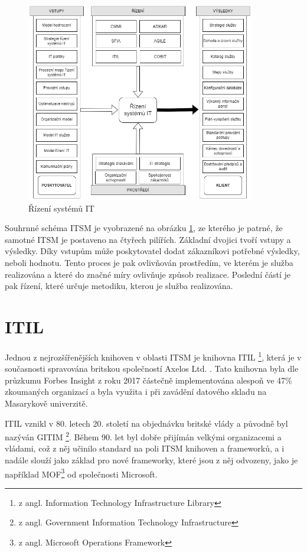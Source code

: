 \documentclass[
  digital,     %
  twoside,     %
  lof,         %
  lot,         %
]{fithesis4}
\begin{document}
\begin{figure}[h]
  \begin{center}
          \includegraphics[width=10cm]{img/itsm-diag.drawio.png}
  \end{center}
  \caption{Řízení systémů IT \parencite[s.~21]{Matula2017}}
  \label{fig:itsmDiag}
\end{figure} 

Souhrnné schéma ITSM je vyobrazené na obrázku \ref{fig:itsmDiag}, ze kterého je patrné, že samotné ITSM je postaveno na čtyřech pilířích. Základní dvojici tvoří vstupy a výsledky. Díky vstupům může poskytovatel dodat zákazníkovi potřebné výsledky, neboli hodnotu. Tento proces je pak ovlivňován prostředím, ve kterém je služba realizována a které do značné míry ovlivňuje způsob realizace. Poslední částí je pak řízení, které určuje metodiku, kterou je služba realizována. 


\section{ITIL}
Jednou z nejrozšířenějších knihoven v oblasti ITSM je knihovna ITIL \footnote{z angl. Information Technology Infrastructure Library}, která je v současnosti spravována britskou společností Axelos Ltd. \parencite[s.~31]{Matula2017}. Tato knihovna byla dle průzkumu Forbes Insight z roku 2017 částečně implementována alespoň ve 47\% zkoumaných organizací\parencite{Watts3082017} a byla využita i při  zavádění datového skladu na Masarykově univerzitě. 

ITIL vznikl v 80. letech 20. století na objednávku britské vlády a původně byl nazýván GITIM \footnote{z angl. Government Information Technology Infrastructure}. Během 90. let byl dobře přijímán velkými organizacemi a vládami, což z něj učinilo standard na poli ITSM knihoven a frameworků, a i nadále slouží jako základ pro nové frameworky, které jsou z něj odvozeny, jako je například MOF\footnote{z angl. Microsoft Operations Framework} od společnosti Microsoft. \parencite[s. ~31]{Matula2017}
\end{document}
